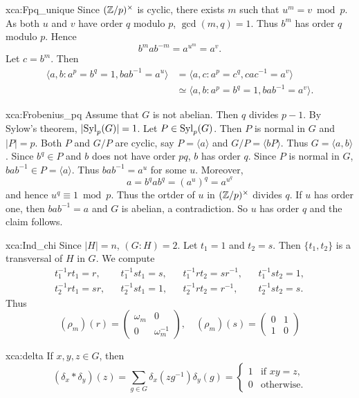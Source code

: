 \begin{sol}{xca:Fpq_unique}
    Since $(\mathbb{Z}/p)^\times$ is cyclic, there exists $m$ such that $u^m=v\bmod p$. As both $u$ and $v$ have order $q$ modulo $p$, $\gcd(m,q)=1$. Thus $b^m$ has order $q$ modulo $p$. Hence 
    \[
    b^mab^{-m}=a^{u^m}=a^{v}.
    \]
    Let $c=b^m$. Then
    \begin{align*}
    \langle a,b:a^p=b^q=1,bab^{-1}=a^u\rangle 
    &= \langle a,c:a^p=c^q,cac^{-1}=a^v\rangle\\
    &\simeq \langle a,b:a^p=b^q=1,bab^{-1}=a^v\rangle.
    \end{align*}
\end{sol}

\begin{sol}{xca:Frobenius_pq}
    Assume that $G$ is not abelian. Then $q$ divides $p-1$. By Sylow's theorem, $|\mathrm{Syl}_p(G)|=1$. 
    Let $P\in\mathrm{Syl}_p(G)$. Then $P$ is normal in $G$ and $|P|=p$. 
    Both $P$ and $G/P$ are cyclic, say $P=\langle a\rangle$ and $G/P=\langle bP\rangle$. Thus 
    $G=\langle a,b\rangle$. Since $b^q\in P$ and $b$ does not have order $pq$, $b$ has order $q$. 
    Since $P$ is normal in $G$, $bab^{-1}\in P=\langle a\rangle$. Thus 
    $bab^{-1}=a^u$ for some $u$. Moreover, 
    \[
    a=b^qab^q=(a^u)^q=a^{u^q}
    \]
    and hence $u^q\equiv 1\bmod p$. Thus the ortder of $u$ in $(\mathbb{Z}/p)^\times$ divides $q$. 
    If $u$ has order one, then $bab^{-1}=a$ and $G$ is abelian, a contradiction. So 
    $u$ has order $q$ and the claim follows. 
\end{sol}


\begin{sol}{xca:Ind_chi}
    Since $|H|=n$, $(G:H)=2$. Let 
    $t_1=1$ and $t_2=s$. Then $\{t_1,t_2\}$ is a transversal of $H$ in $G$. We compute
    \begin{align*}
        t_1^{-1}rt_1=r, && t_1^{-1}st_1=s, && t_1^{-1}rt_2=sr^{-1},&& t_1^{-1}st_2=1, \\
        t_2^{-1}rt_1=sr,&& t_2^{-1}st_1=1,&&
        t_2^{-1}rt_2=r^{-1},&&t_2^{-1}st_2=s.
    \end{align*}
    Thus 
    \[
    (\rho_m)(r)=\begin{pmatrix}
    \omega_m & 0\\
    0&\omega_m^{-1}
    \end{pmatrix},\quad 
     (\rho_m)(s)=\begin{pmatrix}
     0&1\\
     1&0
    \end{pmatrix}
    \]
\end{sol}

\begin{sol}{xca:delta}
	If $x,y,z\in G$, then 
	\[
		(\delta_x*\delta_y)(z)=\sum_{g\in G}\delta_x(zg^{-1})\delta_y(g)=\begin{cases}
			1 & \text{if $xy=z$,}\\
			0 & \text{otherwise.}
		\end{cases}
	\]
\end{sol}